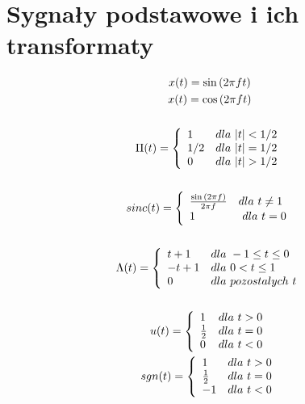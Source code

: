 \newpage
\section{Sygnały podstawowe i ich transformaty}
    \begin{multicols}{2}
        \indent
        \begin{gather*}
            x(t) = \sin{(2\pi ft)}\\
            x(t) = \cos{(2\pi ft)}\\
\\%
            \Pi(t) = \left\{\begin{array}{l l}
                1 & dla\ |t| < 1/2\\
                1/2 & dla\ |t| = 1/2\\
                0 & dla\ |t| > 1/2
            \end{array} \right.\\
\\%
            sinc(t) = \left\{\begin{array}{l l}
                \frac{\sin{(2\pi f)}}{2\pi f} & dla\ t \neq 1\\
                1 &\ dla\ t = 0
            \end{array}\right.\\
\\%
            \Lambda(t) = \left\{\begin{array}{l l}
                t+1 & dla\ -1 \leq t \leq 0\\
                -t+1 & dla\ 0 < t \leq 1\\
                0 & dla\ pozostalych\ t
            \end{array}\right.\\
\\%
            u(t) = \left\{\begin{array}{l l}
                1 & dla\ t>0\\
                \frac{1}{2} & dla\ t=0\\
                0 & dla\ t <0
            \end{array}\right.
\\%
            sgn(t) = \left\{\begin{array}{l l}
                1 & dla\ t>0\\
                \frac{1}{2} & dla\ t=0\\
                -1 & dla\ t <0
            \end{array}\right.
        \end{gather*}


\end{multicols}

